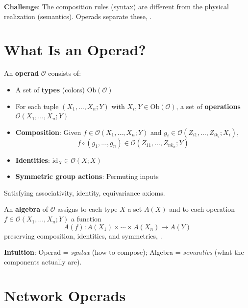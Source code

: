 \textbf{Challenge}: The composition rules (syntax) are different from the physical realization (semantics). Operads separate these, \cite{baez2021operads}.

\section{What Is an Operad?}
\label{sec:op:def}

\begin{definition}
An \textbf{operad} $\mathcal{O}$ consists of: \cite{baez2021operads}
\begin{itemize}
    \item A set of \textbf{types} (colors) $\mathrm{Ob}(\mathcal{O})$
    \item For each tuple $(X_1,\dots,X_n; Y)$ with $X_i, Y \in \mathrm{Ob}(\mathcal{O})$, a set of \textbf{operations} $\mathcal{O}(X_1,\dots,X_n; Y)$
    \item \textbf{Composition}: Given $f \in \mathcal{O}(X_1,\dots,X_n; Y)$ and $g_i \in \mathcal{O}(Z_{i1},\dots,Z_{ik_i}; X_i)$,
        \[
        f \circ (g_1,\dots,g_n) \in \mathcal{O}(Z_{11},\dots,Z_{nk_n}; Y)
        \]
    \item \textbf{Identities}: $\mathrm{id}_X \in \mathcal{O}(X; X)$
    \item \textbf{Symmetric group actions}: Permuting inputs
\end{itemize}
Satisfying associativity, identity, equivariance axioms.
\end{definition}

\begin{definition}
An \textbf{algebra} of $\mathcal{O}$ assigns to each type $X$ a set $A(X)$ and to each operation $f \in \mathcal{O}(X_1,\dots,X_n; Y)$ a function
\[
A(f): A(X_1) \times \cdots \times A(X_n) \to A(Y)
\]
preserving composition, identities, and symmetries, \cite{baez2021operads}.
\end{definition}

\textbf{Intuition}: Operad = \emph{syntax} (how to compose); Algebra = \emph{semantics} (what the components actually are).

\section{Network Operads}
\label{sec:op:network}

